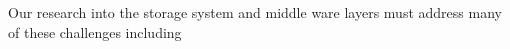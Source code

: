 Our research into the storage system and middle ware layers must address
many of these challenges including
